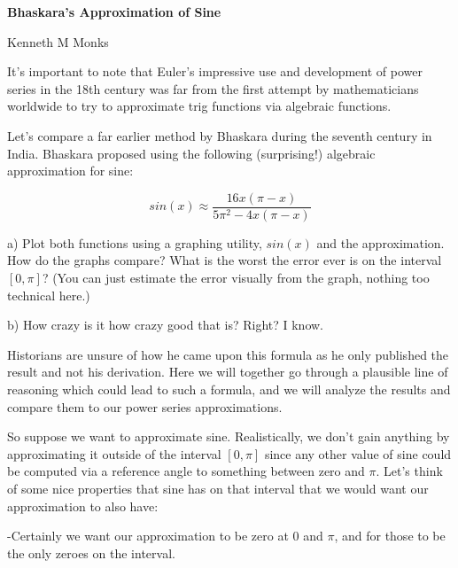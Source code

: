 \begin{center}
{\LARGE \bf Bhaskara's Approximation of Sine}

Kenneth M Monks
\end{center}

It's important to note that Euler's impressive use and development of power series in the 18th century was far from the first attempt by mathematicians worldwide to try to approximate trig functions via algebraic functions.

Let's compare a far earlier method by Bhaskara during the seventh century in India.  Bhaskara proposed using the following (surprising!) algebraic approximation for sine:

$$ sin(x) \approx \frac{16x(\pi-x)}{5\pi^2-4x(\pi-x)}$$


a) Plot both functions using a graphing utility, $sin(x)$ and the approximation.  How do the graphs compare?  What is the worst the error ever is on the interval $\left[ 0,\pi \right] $?  (You can just estimate the error visually from the graph, nothing too technical here.)

\vspace{2in}

b) How crazy is it how crazy good that is?  Right?  I know.

\vspace{1in}

Historians are unsure of how he came upon this formula as he only published the result and not his derivation.  Here we will together go through a plausible line of reasoning which could lead to such a formula, and we will analyze the results and compare them to our power series approximations.

\vspace{.1in}

So suppose we want to approximate sine.  Realistically, we don't gain anything by approximating it outside of the interval $\left[ 0, \pi \right] $ since any other value of sine could be computed via a reference angle to something between zero and $\pi$.  Let's think of some nice properties that sine has on that interval that we would want our approximation to also have:

\vspace{.1in}

-Certainly we want our approximation to be zero at 0 and $\pi$, and for those to be the only zeroes on the interval.

\vspace{.1in}

